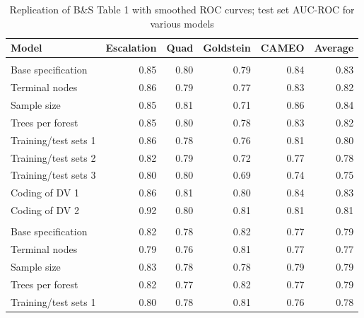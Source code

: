 \documentclass[
]{article}
\begin{document}
\begin{table}

\caption{\label{tab:table1-smooth}Replication of B\&S Table 1 with smoothed ROC curves; test set AUC-ROC for various models}
\centering
\begin{tabular}[t]{lrrrrr}
\toprule
Model & Escalation & Quad & Goldstein & CAMEO & Average\\
\midrule
\addlinespace[0.3em]
\multicolumn{6}{l}{\textbf{One-month forecasts}}\\
\hspace{1em}Base specification & 0.85 & 0.80 & 0.79 & 0.84 & 0.83\\
\hspace{1em}Terminal nodes & 0.86 & 0.79 & 0.77 & 0.83 & 0.82\\
\hspace{1em}Sample size & 0.85 & 0.81 & 0.71 & 0.86 & 0.84\\
\hspace{1em}Trees per forest & 0.85 & 0.80 & 0.78 & 0.83 & 0.82\\
\hspace{1em}Training/test sets 1 & 0.86 & 0.78 & 0.76 & 0.81 & 0.80\\
\hspace{1em}Training/test sets 2 & 0.82 & 0.79 & 0.72 & 0.77 & 0.78\\
\hspace{1em}Training/test sets 3 & 0.80 & 0.80 & 0.69 & 0.74 & 0.75\\
\hspace{1em}Coding of DV 1 & 0.86 & 0.81 & 0.80 & 0.84 & 0.83\\
\hspace{1em}Coding of DV 2 & 0.92 & 0.80 & 0.81 & 0.81 & 0.81\\
\addlinespace[0.3em]
\multicolumn{6}{l}{\textbf{Six-month forecasts}}\\
\hspace{1em}Base specification & 0.82 & 0.78 & 0.82 & 0.77 & 0.79\\
\hspace{1em}Terminal nodes & 0.79 & 0.76 & 0.81 & 0.77 & 0.77\\
\hspace{1em}Sample size & 0.83 & 0.78 & 0.78 & 0.79 & 0.79\\
\hspace{1em}Trees per forest & 0.82 & 0.77 & 0.82 & 0.77 & 0.79\\
\hspace{1em}Training/test sets 1 & 0.80 & 0.78 & 0.81 & 0.76 & 0.78\\

\end{tabular}
\end{table}
\end{document}
